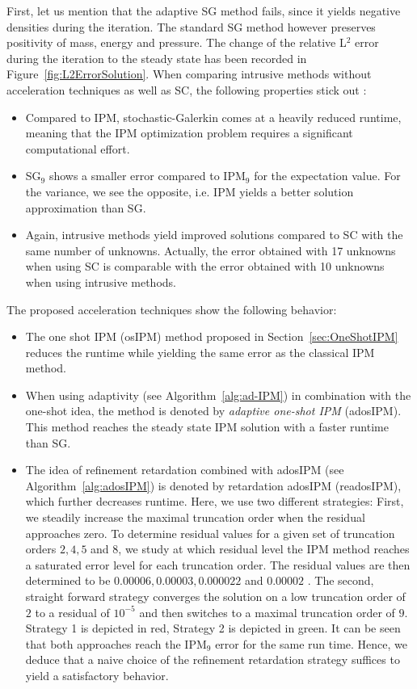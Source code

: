 First, let us mention that the adaptive SG method fails, since it yields negative densities during the iteration. The standard SG method however preserves positivity of mass, energy and pressure. The change of the relative L$^2$ error during the iteration to the steady state has been recorded in Figure~\ref{fig:L2ErrorSolution}. When comparing intrusive methods without acceleration techniques as well as SC, the following properties stick out :
\begin{itemize}
\item Compared to IPM, stochastic-Galerkin comes at a heavily  reduced runtime, meaning that the IPM optimization problem requires a significant computational effort.
\item SG$_9$ shows a smaller error compared to IPM$_9$ for the expectation value. For the variance, we see the opposite, i.e. IPM yields a better solution approximation than SG.
\item Again, intrusive methods yield improved solutions compared to SC with the same number of unknowns. Actually, the error obtained with 17 unknowns when using SC is comparable with the error obtained with 10 unknowns when using intrusive methods.
\end{itemize}
The proposed acceleration techniques show the following behavior:
\begin{itemize}
\item The  one shot IPM (osIPM) method proposed in Section~\ref{sec:OneShotIPM} reduces the runtime while yielding the same error as the classical IPM method.
\item When using adaptivity (see Algorithm~\ref{alg:ad-IPM}) in combination with the one-shot idea, the method is denoted by \textit{adaptive one-shot IPM} (adosIPM). This method reaches the steady state IPM solution with a faster runtime than SG.
\item The idea of refinement retardation combined with adosIPM (see Algorithm~\ref{alg:adosIPM}) is denoted by retardation adosIPM (readosIPM), which further decreases runtime. Here, we use two different strategies: First, we steadily increase the maximal truncation order when the residual approaches zero. To determine residual values for a given set of truncation orders $2,4,5$ and $8$, we study at which residual level the IPM method reaches a saturated error level for each truncation order. The residual values are then determined to be $0.00006,0.00003,0.000022$ and $0.00002$ . The second, straight forward strategy converges the solution on a low truncation order of $2$ to a residual of $10^{-5}$ and then switches to a maximal truncation order of $9$. Strategy 1 is depicted in red, Strategy 2 is depicted in green. It can be seen that both approaches reach the IPM$_9$ error for the same run time. Hence, we deduce that a naive choice of the refinement retardation strategy suffices to yield a satisfactory behavior.
\end{itemize}

